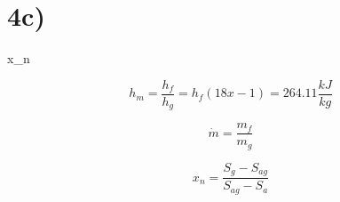 

\section*{4c)}
 x_n

\[
h_{m} = \frac{h_{f}}{h_{g}} = h_{f}(18x-1) = 264.11 \frac{kJ}{kg}
\]

\[
\dot{m} = \frac{m_{f}}{m_{g}}
\]

\[
x_{n} = \frac{S_{g} - S_{ag}}{S_{ag} - S_{a}}
\]